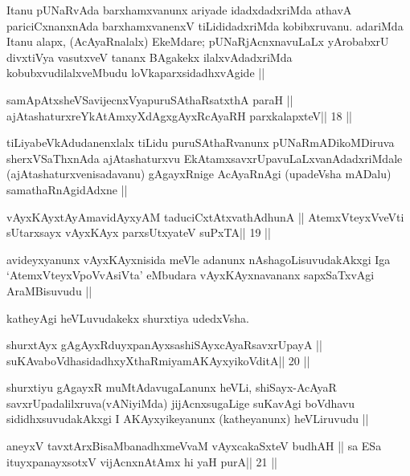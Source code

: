 \begin{artha}
Itanu pUNaRvAda barxhamxvanunx ariyade idadxdadxriMda athavA pariciCxnanxnAda barxhamxvanenxV tiLididadxriMda kobibxruvanu. adariMda Itanu alapx, (AcAyaRnalalx) EkeMdare; pUNaRjAcnxnavuLaLx yArobabxrU divxtiVya vasutxveV tananx BAgakekx ilalxvAdadxriMda kobubxvudilalxveMbudu loVkaparxsidadhxvAgide ||
\end{artha}

\begin{shl}
samApAtxsheVSavijecnxVyapuruSAthaRsatxthA paraH ||
ajAtashaturxreYkAtAmxyXdAgxgAyxRcAyaRH parxkalapxteV\hfill || 18 ||
\end{shl}

\begin{artha}
tiLiyabeVkAdudanenxlalx tiLidu puruSAthaRvanunx pUNaRmADikoMDiruva sherxVSaThxnAda ajAtashaturxvu EkAtamxsavxrUpavuLaLxvanAdadxriMdale (ajAtashaturxvenisadavanu) gAgayxRnige AcAyaRnAgi (upadeVsha mADalu) samathaRnAgidAdxne ||
\end{artha}

\begin{shl}
vAyxKAyxtAyAmavidAyxyAM taduciCxtAtxvathAdhunA ||
AtemxVteyxVveVti sUtarxsayx vAyxKAyx parxsUtxyateV suPxTA\hfill || 19 ||
\end{shl}

\begin{artha}
avideyxyanunx vAyxKAyxnisida meVle adanunx nAshagoLisuvudakAkxgi Iga `AtemxVteyxVpoVvAsiVta' eMbudara vAyxKAyxnavananx sapxSaTxvAgi AraMBisuvudu ||
\end{artha}

\begin{artha}
katheyAgi heVLuvudakekx shurxtiya udedxVsha.
\end{artha} 

\begin{shl}
shurxtAyx gAgAyxRduyxpanAyxsashiSAyxcAyaRsavxrUpayA ||
suKAvaboVdhasidadhxyXthaRmiyamAKAyxyikoVditA\hfill || 20 ||
\end{shl}

\begin{artha}
shurxtiyu gAgayxR muMtAdavugaLanunx heVLi, shiSayx-AcAyaR savxrUpadalilxruva(vANiyiMda) jijAcnxsugaLige suKavAgi boVdhavu sididhxsuvudakAkxgi I AKAyxyikeyanunx (katheyanunx) heVLiruvudu ||
\end{artha}


\begin{shl}
aneyxV tavxtArxBisaMbanadhxmeVvaM vAyxcakaSxteV budhAH ||
sa ESa ituyxpanayxsotxV vijAcnxnAtAmx hi yaH purA\hfill || 21 ||
\end{shl}

